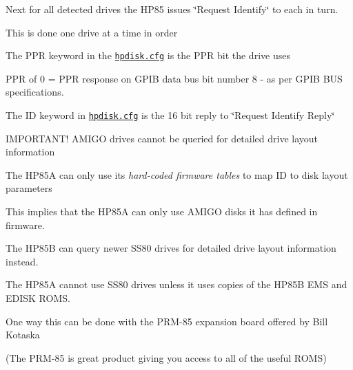 \begin{DoxyItemize}
\begin{DoxyItemize}
\item Next for all detected drives the H\+P85 issues \char`\"{}\+Request Identify\char`\"{} to each in turn.
\begin{DoxyItemize}
\item This is done one drive at a time in order
\item The P\+PR keyword in the \href{sdcard/hpdisk.cfg}{\tt hpdisk.\+cfg} is the P\+PR bit the drive uses
\begin{DoxyItemize}
\item P\+PR of 0 = P\+PR response on G\+P\+IB data bus bit number 8 -\/ as per G\+P\+IB B\+US specifications.
\end{DoxyItemize}
\item The ID keyword in \href{sdcard/hpdisk.cfg}{\tt hpdisk.\+cfg} is the 16 bit reply to \char`\"{}\+Request Identify Reply\char`\"{}
\begin{DoxyItemize}
\item I\+M\+P\+O\+R\+T\+A\+N\+T! A\+M\+I\+GO drives cannot be queried for detailed drive layout information
\begin{DoxyItemize}
\item The H\+P85A can only use its {\itshape hard-\/coded firmware tables} to map ID to disk layout parameters
\item This implies that the H\+P85A can only use A\+M\+I\+GO disks it has defined in firmware.
\end{DoxyItemize}
\item The H\+P85B can query newer S\+S80 drives for detailed drive layout information instead.
\item The H\+P85A cannot use S\+S80 drives unless it uses copies of the H\+P85B E\+MS and E\+D\+I\+SK R\+O\+MS.
\begin{DoxyItemize}
\item One way this can be done with the P\+R\+M-\/85 expansion board offered by Bill Kotaska
\begin{DoxyItemize}
\item (The P\+R\+M-\/85 is great product giving you access to all of the useful R\+O\+MS) 


\end{DoxyItemize}
\end{DoxyItemize}
\end{DoxyItemize}
\end{DoxyItemize}
\end{DoxyItemize}
\end{DoxyItemize}

